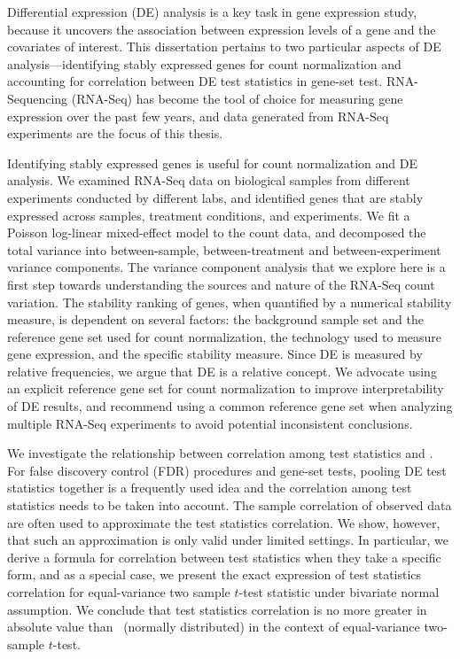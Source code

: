
Differential expression (DE) analysis is a key task in gene expression study, because it uncovers 
the association between expression levels of a gene and the covariates of interest.
This dissertation pertains to two particular aspects of DE analysis---identifying stably expressed 
genes for count normalization and accounting for correlation between DE test statistics in gene-set 
test. RNA-Sequencing (RNA-Seq) has become the tool of choice for measuring gene expression over the 
past few years, and data generated from RNA-Seq experiments are the focus of this thesis. 

Identifying stably expressed genes is useful for count normalization and DE analysis. We examined 
RNA-Seq data on \howmanySamples biological samples from \howmanylab different experiments conducted 
by different labs, and identified genes that are stably expressed across samples, treatment 
conditions, and experiments. We fit a Poisson log-linear mixed-effect model to the count data, and 
decomposed the total variance into between-sample, between-treatment and between-experiment 
variance components. The variance 
component analysis that we explore here is a first step towards understanding the sources and 
nature of the RNA-Seq count variation. The stability ranking of genes, when quantified by a 
numerical stability measure, is dependent on several factors: the background sample set and the 
reference gene set used for count normalization, the 
technology used to measure gene expression, and the specific stability measure. Since DE is 
measured by relative frequencies, we argue that DE is a relative concept. We advocate using an 
explicit reference gene set for count normalization to improve interpretability of DE results, and 
recommend using a common reference gene set when analyzing multiple RNA-Seq experiments to avoid 
potential inconsistent conclusions.


We investigate the relationship between correlation among test statistics and \popucor. For false 
discovery control (FDR) procedures and gene-set tests, pooling DE test 
statistics together is a frequently used idea and the correlation among test statistics needs to be 
taken into account. The sample correlation of observed data are often used to approximate the 
test statistics correlation. We show, however, that such an approximation is only valid under 
limited settings. In particular, we derive a formula for correlation between test statistics when 
they take a specific form, and as a special case, we present the exact expression of test 
statistics correlation for equal-variance two sample $t$-test statistic under bivariate 
normal assumption. We conclude that test statistics correlation is no more greater in absolute 
value than \popucor~(normally distributed) in the context of 
equal-variance two-sample $t$-test.

